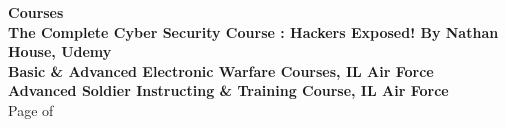 \documentclass[oneside]{article}
\begin{document}
{\begin{minipage}[t][\dimexpr\textheight-2\fboxrule-2\fboxsep\relax][t]{\dimexpr0.6\textwidth-2\fboxrule-2\fboxsep\relax}
          {\LARGE \textbf{Courses}} \\
        \vspace{1\baselineskip} 
        \textbf{\large The Complete Cyber Security Course : Hackers Exposed! By Nathan House, Udemy} \\
        \vspace{1\baselineskip} 
        \textbf{\large Basic \& Advanced Electronic Warfare Courses, IL Air Force} \\
        \vspace{1\baselineskip} 
        \textbf{\large Advanced Soldier Instructing \& Training Course, IL Air Force} \\
        
                       \vfill%
        {\hfill\small{}\selectfont Page \thepage \hspace{0.1em} of \pageref{LastPage}\hfill}
        
    \end{minipage}
}
\hfill%
\end{document}
